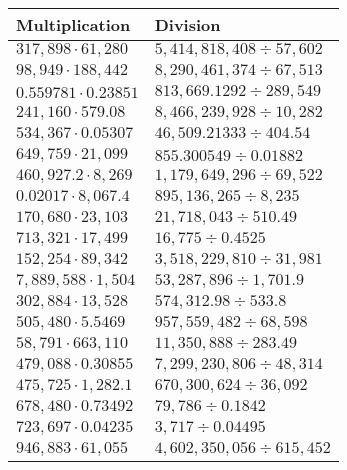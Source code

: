 \begin{longtable}[]{@{}ll@{}}
\toprule
Multiplication & Division\tabularnewline
\midrule
\endhead
\(317,898\cdot61,280\) & \(5,414,818,408÷57,602\)\tabularnewline
\(98,949\cdot188,442\) & \(8,290,461,374÷67,513\)\tabularnewline
\(0.559781\cdot0.23851\) & \(813,669.1292÷289,549\)\tabularnewline
\(241,160\cdot579.08\) & \(8,466,239,928÷10,282\)\tabularnewline
\(534,367\cdot0.05307\) & \(46,509.21333÷404.54\)\tabularnewline
\(649,759\cdot21,099\) & \(855.300549÷0.01882\)\tabularnewline
\(460,927.2\cdot8,269\) & \(1,179,649,296÷69,522\)\tabularnewline
\(0.02017\cdot8,067.4\) & \(895,136,265÷8,235\)\tabularnewline
\(170,680\cdot23,103\) & \(21,718,043÷510.49\)\tabularnewline
\(713,321\cdot17,499\) & \(16,775÷0.4525\)\tabularnewline
\(152,254\cdot89,342\) & \(3,518,229,810÷31,981\)\tabularnewline
\(7,889,588\cdot1,504\) & \(53,287,896÷1,701.9\)\tabularnewline
\(302,884\cdot13,528\) & \(574,312.98÷533.8\)\tabularnewline
\(505,480\cdot5.5469\) & \(957,559,482÷68,598\)\tabularnewline
\(58,791\cdot663,110\) & \(11,350,888÷283.49\)\tabularnewline
\(479,088\cdot0.30855\) & \(7,299,230,806÷48,314\)\tabularnewline
\(475,725\cdot1,282.1\) & \(670,300,624÷36,092\)\tabularnewline
\(678,480\cdot0.73492\) & \(79,786÷0.1842\)\tabularnewline
\(723,697\cdot0.04235\) & \(3,717÷0.04495\)\tabularnewline
\(946,883\cdot61,055\) & \(4,602,350,056÷615,452\)\tabularnewline
\bottomrule
\end{longtable}
